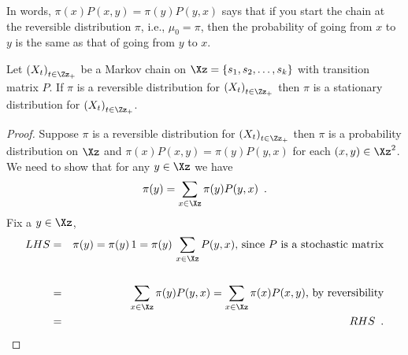 In words, $\pi(x) P(x,y) = \pi(y) P(y,x)$ says that if you start the chain at the reversible distribution $\pi$, i.e., $\mu_0 = \pi$, then the probability of going from $x$ to $y$ is the same as that of going from $y$ to $x$.

\begin{prop}\label{P:ReversibleIsStationary}
Let $\left(X_t\right)_{t \in \Zz_+}$ be a Markov chain on $\Xz = \{s_1,s_2,\ldots,s_k\}$ with transition matrix $P$.  
If $\pi$ is a reversible distribution for $\left(X_t\right)_{t \in \Zz_+}$ then $\pi$ is a stationary distribution for $\left(X_t\right)_{t \in \Zz_+}$.
\begin{proof}
Suppose $\pi$ is a reversible distribution for $\left(X_t\right)_{t \in \Zz_+}$ then $\pi$ is a probability distribution on $\Xz$ and $\pi(x) P(x,y) = \pi(y) P(y,x)$ for each $(x,y)\in \Xz^2$.  
We need to show that for any $y \in \Xz$ we have $$\pi(y)=\sum_{x\in\Xz}\pi(y) P(y,x) \enspace .$$ 
Fix a $y \in \Xz$,
\begin{eqnarray*}
LHS 
&=& \pi(y)= \pi(y) \, 1 = \pi(y) \, \sum_{x \in \Xz} P(y,x) \text{, since $P$ is a stochastic matrix} \\\\
&=& \sum_{x \in \Xz} \pi(y) P(y,x) = \sum_{x \in \Xz} \pi(x) P(x,y) \text{,  by reversibility} \\
&=& RHS \enspace .
\end{eqnarray*}
\end{proof}
\end{prop}



